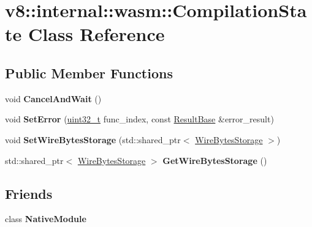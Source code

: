 \hypertarget{classv8_1_1internal_1_1wasm_1_1CompilationState}{}\section{v8\+:\+:internal\+:\+:wasm\+:\+:Compilation\+State Class Reference}
\label{classv8_1_1internal_1_1wasm_1_1CompilationState}
\subsection*{Public Member Functions}
\begin{DoxyCompactItemize}
\item 
\mbox{\label{classv8_1_1internal_1_1wasm_1_1CompilationState_ac0f341fd1ecf28c85aca64cc96da14cf}} 
void {\bfseries Cancel\+And\+Wait} ()
\item 
\mbox{\label{classv8_1_1internal_1_1wasm_1_1CompilationState_a0dbd88e706f42e7b44b420d54d02ca21}} 
void {\bfseries Set\+Error} (\mbox{\hyperlink{classuint32__t}{uint32\+\_\+t}} func\+\_\+index, const \mbox{\hyperlink{classv8_1_1internal_1_1wasm_1_1ResultBase}{Result\+Base}} \&error\+\_\+result)
\item 
\mbox{\label{classv8_1_1internal_1_1wasm_1_1CompilationState_a82cff25a5e68e95bd42f7c5c45058171}} 
void {\bfseries Set\+Wire\+Bytes\+Storage} (std\+::shared\+\_\+ptr$<$ \mbox{\hyperlink{classv8_1_1internal_1_1wasm_1_1WireBytesStorage}{Wire\+Bytes\+Storage}} $>$)
\item 
\mbox{\label{classv8_1_1internal_1_1wasm_1_1CompilationState_abdaa09e5a001ba2914e72a7c97685b31}} 
std\+::shared\+\_\+ptr$<$ \mbox{\hyperlink{classv8_1_1internal_1_1wasm_1_1WireBytesStorage}{Wire\+Bytes\+Storage}} $>$ {\bfseries Get\+Wire\+Bytes\+Storage} ()
\end{DoxyCompactItemize}
\subsection*{Friends}
\begin{DoxyCompactItemize}
\item 
\mbox{\label{classv8_1_1internal_1_1wasm_1_1CompilationState_ab2eba8bcd9cf5215e8ce842fad93a987}} 
class {\bfseries Native\+Module}
\end{DoxyCompactItemize}


